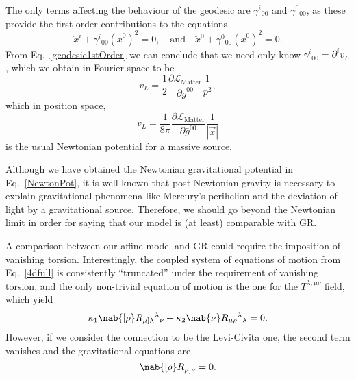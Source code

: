 \documentclass[aps,prl,twocolumn,superscriptaddress,showpacs,showkeys]{revtex4-1}
\begin{document}
The only terms affecting the behaviour of the geodesic are $\gamma^i{}_{00}$ and $\gamma^0{}_{00}$, as these provide the first order contributions to the equations
\begin{equation}
  \label{geodesic1stOrder}
  \ddot{x}^i + \gamma^i{}_{00}(\dot{x}^0)^2 = 0,
  \quad \text{and} \quad
  \ddot{x}^0 + \gamma^0{}_{00}(\dot{x}^0)^2 = 0.
\end{equation}
From Eq.~\eqref{geodesic1stOrder} we can conclude that we need only know $\gamma^i{}_{00} = \partial^i v_L$, which we obtain in Fourier space to be
\begin{equation}
  v_L=\frac{1}{2}\frac{\partial\mathcal{L}_{\text{Matter}}}{\partial\bar{g}^{00}}\frac{1}{p^2},
\end{equation}
which in position space, 
\begin{equation}
  \label{NewtonPot}
  v_L = \frac{1}{8\pi} \frac{ \partial\mathcal{L}_{\text{Matter}} }{ \partial \bar{g}^{00} } \frac{1}{|\vec{x}|}
\end{equation}
is the usual Newtonian potential for a massive source.

Although we have obtained the Newtonian gravitational potential in Eq.~\eqref{NewtonPot}, it is well known that post-Newtonian gravity is necessary to explain gravitational phenomena like Mercury's perihelion and the deviation of light by a gravitational source. Therefore, we should go beyond the Newtonian limit in order for saying that our model is (at least) comparable with GR.

A comparison between our affine model and GR could require the imposition of vanishing torsion. Interestingly, the coupled system of equations of motion from Eq.~\eqref{4dfull} is consistently ``truncated'' under the requirement of vanishing torsion, and the only non-trivial equation of motion is the one for the $T^{\lambda,\mu\nu}$ field, which yield
\begin{equation}
  \kappa_1 \nab{[\rho} R_{\mu]\lambda}{}^{\lambda}{}_{\nu} + \kappa_2 \nab{\nu} R_{\mu\rho}{}^\lambda{}_\lambda = 0.
\end{equation}
However, if we consider the connection to be the Levi-Civita one, the second term vanishes and the gravitational equations are
\begin{equation}
  \nab{[\rho} R_{\mu]\nu} = 0.
  \label{SimpleEOM}
\end{equation}
\end{document}
